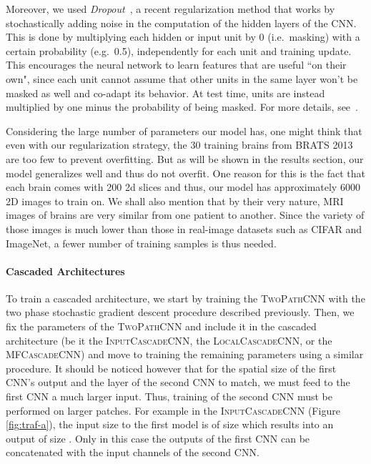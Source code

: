\documentclass[final,5p,times,twocolumn]{elsarticle}
\begin{document}
Moreover, we used {\it Dropout}~\citep{Srivastava14a}, a recent regularization method that works by stochastically adding noise in the computation of the hidden layers of the CNN. This is done by multiplying each hidden or input unit by 0 (i.e.\ masking) with a certain probability (e.g.\ 0.5), independently for each unit and training update. This encourages the neural network to learn features that are useful ``on their own", since each unit cannot assume that other units in the same layer won't be masked as well and co-adapt its behavior. At test time, units are instead multiplied by one minus the probability of being masked. For more details, see~\citet{Srivastava14a}.

 Considering the large number of parameters our model has, one might think that even with our regularization strategy, the 30 training brains from BRATS 2013 are too few to prevent overfitting.  But as will be shown in the results section, our model generalizes well and thus do not overfit.  One reason for this is the fact that each brain comes with 200 2d slices and thus, our model has approximately 6000 2D images to train on.   We shall also mention that by their very nature, MRI images of brains are very similar from one patient to another. Since the variety of those images is much lower than those in real-image datasets such as CIFAR and ImageNet, a fewer number of training samples is thus needed.

\paragraph{Cascaded Architectures}



To train a cascaded architecture, we start by training the \textsc{TwoPathCNN} with the two phase stochastic gradient descent procedure described previously. Then, we fix the parameters of the \textsc{TwoPathCNN} and include it in the cascaded architecture (be it the \textsc{InputCascadeCNN}, the \textsc{LocalCascadeCNN}, or the \textsc{MFCascadeCNN}) and move to training the remaining parameters using a similar procedure. It should be noticed however that for the spatial size of the first CNN's output and the layer of the second CNN to match, we must feed to the first CNN a much larger input. Thus, training of the second CNN must be performed on larger patches. For example in the \textsc{InputCascadeCNN} (Figure \ref{fig:traf-a}), the input size to the first model is of size  which results into an output of size . Only in this case the outputs of the first CNN can be concatenated with the input channels of the second CNN. 
\end{document}
